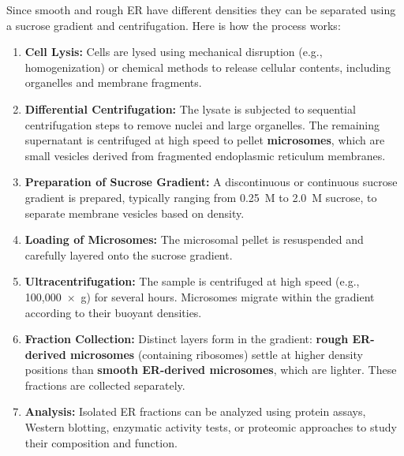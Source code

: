 \documentclass[../main.tex]{subfiles}
\begin{document}
Since smooth and rough ER have different densities they can be separated using a sucrose gradient and centrifugation. Here is how the process works:
\begin{enumerate}
    \item \textbf{Cell Lysis:} Cells are lysed using mechanical disruption (e.g., homogenization) or chemical methods to release cellular contents, including organelles and membrane fragments.
    
    \item \textbf{Differential Centrifugation:} The lysate is subjected to sequential centrifugation steps to remove nuclei and large organelles. The remaining supernatant is centrifuged at high speed to pellet \textbf{microsomes}, which are small vesicles derived from fragmented endoplasmic reticulum membranes.

    \item \textbf{Preparation of Sucrose Gradient:} A discontinuous or continuous sucrose gradient is prepared, typically ranging from 0.25~M to 2.0~M sucrose, to separate membrane vesicles based on density.

    \item \textbf{Loading of Microsomes:} The microsomal pellet is resuspended and carefully layered onto the sucrose gradient.

    \item \textbf{Ultracentrifugation:} The sample is centrifuged at high speed (e.g., 100{,}000~$\times$~g) for several hours. Microsomes migrate within the gradient according to their buoyant densities.

    \item \textbf{Fraction Collection:} Distinct layers form in the gradient: \textbf{rough ER-derived microsomes} (containing ribosomes) settle at higher density positions than \textbf{smooth ER-derived microsomes}, which are lighter. These fractions are collected separately.

    \item \textbf{Analysis:} Isolated ER fractions can be analyzed using protein assays, Western blotting, enzymatic activity tests, or proteomic approaches to study their composition and function.
\end{enumerate}
\end{document}
